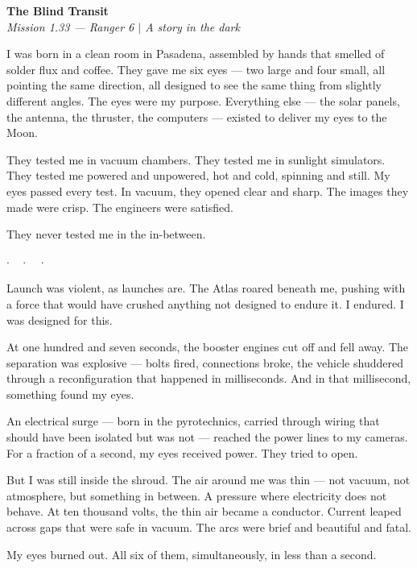 \documentclass[12pt,letterpaper]{article}
\begin{document}
\begin{center}
{\LARGE\bfseries The Blind Transit}\\[0.5em]
{\normalsize\itshape Mission 1.33 --- Ranger 6 $|$ A story in the dark}
\end{center}

\vspace{2em}

I was born in a clean room in Pasadena, assembled by hands that smelled of solder flux and coffee. They gave me six eyes --- two large and four small, all pointing the same direction, all designed to see the same thing from slightly different angles. The eyes were my purpose. Everything else --- the solar panels, the antenna, the thruster, the computers --- existed to deliver my eyes to the Moon.

They tested me in vacuum chambers. They tested me in sunlight simulators. They tested me powered and unpowered, hot and cold, spinning and still. My eyes passed every test. In vacuum, they opened clear and sharp. The images they made were crisp. The engineers were satisfied.

They never tested me in the in-between.

\begin{center}
$\cdot\quad\cdot\quad\cdot$
\end{center}

Launch was violent, as launches are. The Atlas roared beneath me, pushing with a force that would have crushed anything not designed to endure it. I endured. I was designed for this.

At one hundred and seven seconds, the booster engines cut off and fell away. The separation was explosive --- bolts fired, connections broke, the vehicle shuddered through a reconfiguration that happened in milliseconds. And in that millisecond, something found my eyes.

An electrical surge --- born in the pyrotechnics, carried through wiring that should have been isolated but was not --- reached the power lines to my cameras. For a fraction of a second, my eyes received power. They tried to open.

But I was still inside the shroud. The air around me was thin --- not vacuum, not atmosphere, but something in between. A pressure where electricity does not behave. At ten thousand volts, the thin air became a conductor. Current leaped across gaps that were safe in vacuum. The arcs were brief and beautiful and fatal.

My eyes burned out. All six of them, simultaneously, in less than a second.
\end{document}
